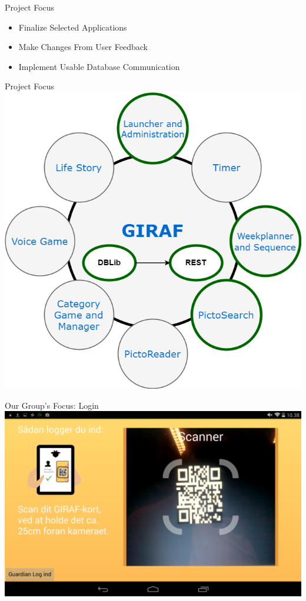 \begin{frame}{Project Focus}
\begin{itemize}
	\item Finalize Selected Applications
	\item Make Changes From User Feedback
	\item Implement Usable Database Communication
\end{itemize}
\end{frame}

\begin{frame}{Project Focus}
\includegraphics[scale=0.21]{figures/GirafFocus.png} 
\end{frame}

\begin{frame}{Our Group's Focus: Login}
\includegraphics[scale=0.21]{figures/Login.png} 
\end{frame}

